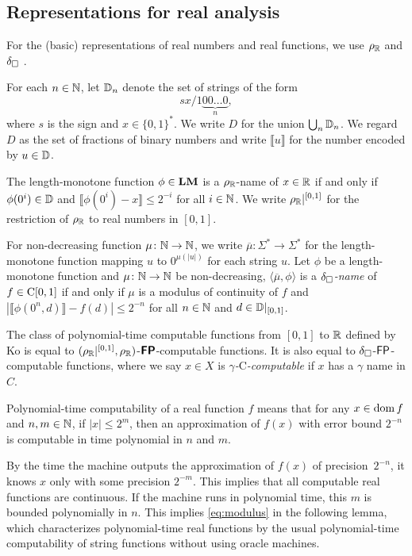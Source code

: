 \documentclass[envcountsame,orivec,oribibl]{llncs}
\begin{document}
\subsection{Representations for real analysis}


For the (basic) representations of real numbers and real functions,
we use $\rho _\mathbb R$ and $\delta _\square$ \cite{kawamura2012complexity}.

For each $n \in \mathbb N$, let $\mathbb D_n$ denote the set of strings of the form
\begin{equation}
 sx/1\!\underbrace{00\dots0}_{n},
\end{equation}
where $s$ is the sign and $x \in \{0,1\}^*$.
We write $D$ for the union $\bigcup _n \mathbb D _n$.
We regard $D$ as the set of fractions of binary numbers
and write $\llbracket u \rrbracket$ for the number encoded by $u \in \mathbb D$.

The length-monotone function $\phi \in \mathbf{LM}$ is a $\rho _\mathbb R$-name of $x \in \mathbb R$ 
if and only if $\phi(0^i) \in \mathbb D$ and $\llbracket \phi(0^i) - x \rrbracket \le 2^{-i}$
for all $i \in \mathbb N$.
We write $\rho _\mathbb R|^{[0,1]}$ for the restriction of $\rho _\mathbb R$ to real numbers in $[0,1]$.

For non-decreasing function $\mu \colon \mathbb N \to \mathbb N$, 
we write $\overline \mu \colon \Sigma^* \to \Sigma^*$ for the length-monotone
function mapping $u$ to $0^{\mu(|u|)}$ for each string $u$.
Let $\phi$ be a length-monotone function and $\mu \colon \mathbb N \to \mathbb N$ be non-decreasing,
$\langle \overline{\mu}, \phi \rangle$ is a {\em $\delta _\square$-name} of $f \in \mathrm C[0,1]$
if and only if $\mu$ is a modulus of continuity of $f$
and $|\llbracket \phi(0^n, d) \rrbracket - f(d)| \le 2^{-n}$ for all $n \in \mathbb N$ and $d \in \mathbb D|_{[0,1]}$.


The class of polynomial-time computable functions from $[0,1]$ to $\mathbb R$ 
defined by Ko is equal to
$(\rho _\mathbb R|^{[0,1]},\rho _\mathbb R)$-$\text{\bfseries \sffamily \upshape FP}$-computable functions.
It is also equal to $\delta _\square$-$\mathsf{FP}$-computable functions,
where we say $x \in X$ is \emph{$\gamma$-$\mathrm C$-computable} if
$x$ has a $\gamma$ name in $C$.

Polynomial-time computability of a real function $f$ means that
for any $x \in \mathop{\rm dom} f$ and $n,m \in \mathbb N$, 
if $|x| \le 2^m$, then
an approximation of $f(x)$ with error bound $2^{-n}$
is computable in time polynomial in $n$ and $m$.

By the time the machine outputs the approximation of $f (x)$ of precision~$2 ^{-n}$, 
it knows $x$ only with some precision $2 ^{-m}$.
This implies that all computable real functions are continuous.
If the machine runs in polynomial time,
this $m$ is bounded polynomially in $n$.
This implies \eqref{eq:modulus} in the following lemma, 
which characterizes polynomial-time real functions
by the usual polynomial-time computability of string functions 
without using oracle machines. 
\end{document}
